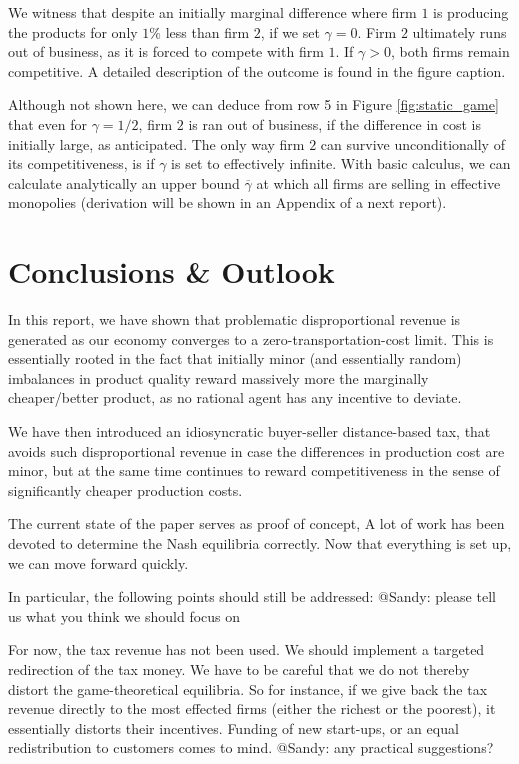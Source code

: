 \documentclass[final,3p,times,authoryear,12pt]{elsarticle}
\newcommand{\red}[1]{\textcolor{WildStrawberry}{#1}} %
\begin{document}
We witness that despite an initially marginal difference where firm $1$ is producing the products for only $1\%$ less than firm $2$, if we set $\gamma=0$. 
Firm $2$ ultimately runs out of business, as it is forced to compete with firm $1$. 
If $\gamma > 0$, both firms remain competitive. 
A detailed description of the outcome is found in the figure caption. 

Although not shown here, we can deduce from row 5 in Figure \ref{fig:static_game} that even for $\gamma = 1/2$, firm $2$ is ran out of business, if the difference in cost is initially large, as anticipated. 
The only way firm $2$ can survive unconditionally of its competitiveness, is if $\gamma$ is set to effectively infinite. 
With basic calculus, we can calculate analytically an upper bound $\overline{\gamma}$ at which all firms are selling in effective monopolies (derivation will be shown in an Appendix of a next report). 

\section{Conclusions \& Outlook}
\label{sec:conclusions} 

In this report, we have shown that problematic disproportional revenue is generated as our economy converges to a zero-transportation-cost limit. 
This is essentially rooted in the fact that initially minor (and essentially random) imbalances in product quality reward massively more the marginally cheaper/better product, 
as no rational agent has any incentive to deviate. 

We have then introduced an idiosyncratic buyer-seller distance-based tax, that avoids such disproportional revenue in case the differences in production cost are minor, 
but at the same time continues to reward competitiveness in the sense of significantly cheaper production costs. 

The current state of the paper serves as proof of concept, 
A lot of work has been devoted to determine the Nash equilibria correctly. 
Now that everything is set up, we can move forward quickly. 

In particular, the following points should still be addressed: 
\red{@Sandy: please tell us what you think we should focus on}

For now, the tax revenue has not been used. 
We should implement a targeted redirection of the tax money. 
We have to be careful that we do not thereby distort the game-theoretical equilibria. 
So for instance, if we give back the tax revenue directly to the most effected firms (either the richest or the poorest), it essentially distorts their incentives. 
Funding of new start-ups, or an equal redistribution to customers comes to mind. 
\red{@Sandy: any practical suggestions?}
\end{document}
